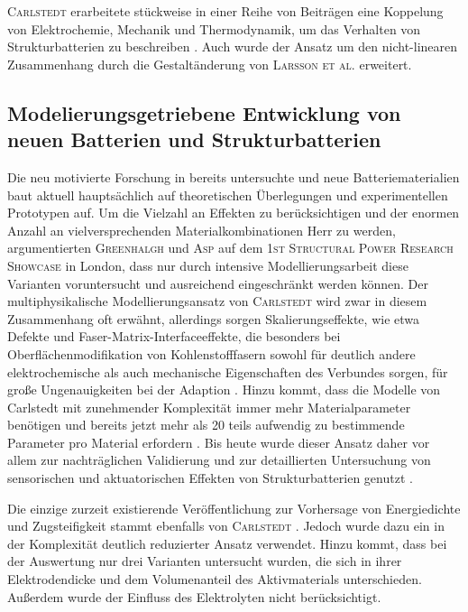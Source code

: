 \textsc{Carlstedt} erarbeitete stückweise in einer Reihe von Beiträgen eine Koppelung von Elektrochemie, Mechanik und Thermodynamik, um das Verhalten von Strukturbatterien zu beschreiben \cite{Carlstedt2019,Carlstedt2019a,Carlstedt2019b,Carlstedt2020,Carlstedt2020b,Carlstedt2022,Carlstedt2022a,Carlstedt2022b}. Auch wurde der Ansatz um den nicht-linearen Zusammenhang durch die Gestaltänderung von \textsc{Larsson et al.} \cite{Larsson2023} erweitert.

\subsection*{Modelierungsgetriebene Entwicklung von neuen Batterien und Strukturbatterien}

Die neu motivierte Forschung in bereits untersuchte und neue Batteriematerialien baut aktuell hauptsächlich auf theoretischen Überlegungen und experimentellen Prototypen auf. Um die Vielzahl an Effekten zu berücksichtigen und der enormen Anzahl an vielversprechenden Materialkombinationen Herr zu werden, argumentierten \textsc{Greenhalgh} \cite{Greenhalgh2024,Greenhalgh2024a} und \textsc{Asp} \cite{Asp2024} auf dem \textsc{1st Structural Power Research Showcase} in London, dass nur durch intensive Modellierungsarbeit diese Varianten voruntersucht und ausreichend eingeschränkt werden können. Der multiphysikalische Modellierungsansatz von \textsc{Carlstedt} wird zwar in diesem Zusammenhang oft erwähnt, allerdings sorgen Skalierungseffekte, wie etwa Defekte und Faser-Matrix-Interfaceeffekte, die besonders bei Oberflächenmodifikation von Kohlenstofffasern sowohl für deutlich andere elektrochemische als auch mechanische Eigenschaften des Verbundes sorgen, für große Ungenauigkeiten bei der Adaption \cite{Franco2019,Fam2024}. Hinzu kommt, dass die Modelle von Carlstedt mit zunehmender Komplexität immer mehr Materialparameter benötigen und bereits jetzt mehr als 20 teils aufwendig zu bestimmende Parameter pro Material erfordern \cite{Greenhalgh2024a}. Bis heute wurde dieser Ansatz daher vor allem zur nachträglichen Validierung und zur detaillierten Untersuchung von sensorischen und aktuatorischen Effekten von Strukturbatterien genutzt \cite{Carlstedt2023}.

Die einzige zurzeit existierende Veröffentlichung zur Vorhersage von Energiedichte und Zugsteifigkeit stammt ebenfalls von \textsc{Carlstedt} \cite{Carlstedt2018}. Jedoch wurde dazu ein in der Komplexität deutlich reduzierter Ansatz verwendet. Hinzu kommt, dass bei der Auswertung nur drei Varianten untersucht wurden, die sich in ihrer Elektrodendicke und dem Volumenanteil des Aktivmaterials unterschieden. Außerdem wurde der Einfluss des Elektrolyten nicht berücksichtigt.



